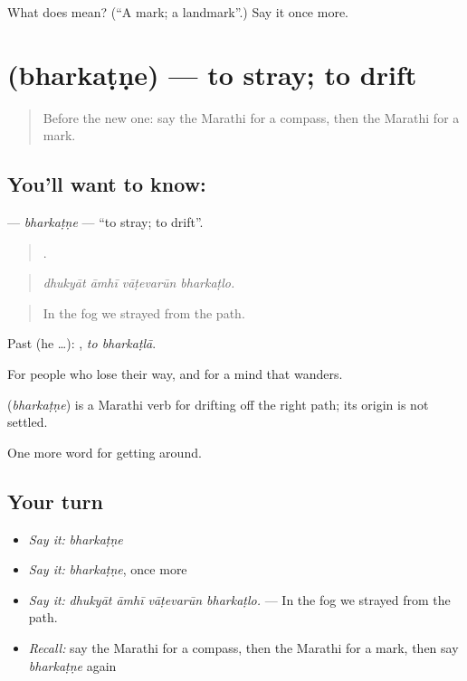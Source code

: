 \begin{tcolorbox}[breakable,colback=teal!4,colframe=teal!35!black,title={Before you move on}]
What does  mean? (\textquotedblleft{}A mark; a landmark\textquotedblright{}.) Say it once more.
\end{tcolorbox}
\section[\texorpdfstring{\mr{भरकटणे} (bharkaṭṇe)}{भरकटणे (bharkaṭṇe)}]{ (bharkaṭṇe) — to stray; to drift}

\label{lesson:MR-C412-bharkatne}



\begin{quote}
Before the new one: say the Marathi for a compass, then the Marathi for a mark.
\end{quote}

\subsection*{You'll want to know: }
\textbf{} — \emph{bharkaṭṇe} — \textquotedblleft{}to stray; to drift\textquotedblright{}.

\begin{quote}
   .
\end{quote}

\begin{quote}
\emph{dhukyāt āmhī vāṭevarūn bharkaṭlo.}
\end{quote}

\begin{quote}
In the fog we strayed from the path.
\end{quote}

Past (he …):  , \emph{to bharkaṭlā}.

For people who lose their way, and for a mind that wanders.

\begin{cousinweb}
\textbf{} (\emph{bharkaṭṇe}) is a Marathi verb for drifting off the right path; its origin is not settled.
\end{cousinweb}

\begin{grammarlens}[title={What you've built}]
One more word for getting around.
\end{grammarlens}

\subsection*{Your turn}
\begin{itemize}
\raggedright
  \item \emph{Say it:} \emph{bharkaṭṇe}
  \item \emph{Say it:} \emph{bharkaṭṇe}, once more
  \item \emph{Say it:} \emph{dhukyāt āmhī vāṭevarūn bharkaṭlo.} — In the fog we strayed from the path.
  \item \emph{Recall:} say the Marathi for a compass, then the Marathi for a mark, then say \emph{bharkaṭṇe} again
\end{itemize}

